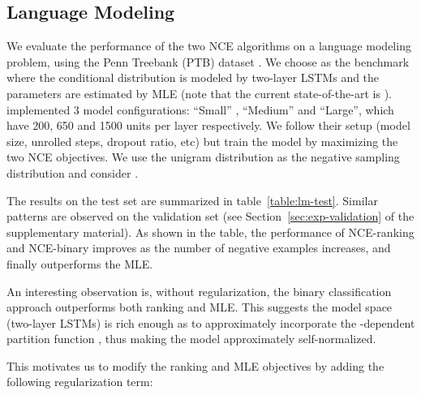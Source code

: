 \documentclass[11pt,a4paper]{article}
\newcommand{\commentout}[1]{}
\begin{document}
\subsection{Language Modeling}
\label{sec:lm}

We evaluate the performance of the two NCE algorithms on a language
modeling problem, using the Penn Treebank (PTB) dataset
\cite{marcus1993building}. 
We choose \cite{zaremba2014recurrent} as the benchmark where the
 conditional distribution is modeled by two-layer LSTMs and the parameters are estimated by MLE (note that the current state-of-the-art is \cite{yang2018breaking}). 
\citet{zaremba2014recurrent} implemented 3 model configurations:
``Small'' , ``Medium'' and ``Large'', which have 200, 650 and 1500
units per layer respectively. We follow their setup
(model size, unrolled steps, dropout ratio, etc) but train the model by maximizing the two
NCE objectives. We use the unigram distribution as the negative sampling distribution and consider . 
\commentout{
The current state-of-art results were achieved by \cite{zaremba2014recurrent}
using two-layer recurrent neural networks with LSTM units and dropout.
\cite{zaremba2014recurrent} implemented 3 model configurations:
``Small'' , ``Medium'' and ``Large'', which have 200, 650 and 1500
units per layer respectively (see \citep{zaremba2014recurrent} for
more details).  These models are trained by maximizing the likelihood
function, which is computationally intensive.  We follow the setup
(model size, unrolled steps, dropout ratio, etc) of
\cite{zaremba2014recurrent} but train the model by maximizing the two
NCE objectives. We use the unigram distribution as the negative sampling distribution and consider . }


The results on the test set are summarized in table~\ref{table:lm-test}. Similar patterns are observed on the validation set (see Section~\ref{sec:exp-validation} of the supplementary material). As shown in the table, the performance of NCE-ranking and NCE-binary improves as the number of negative examples increases, and finally outperforms the MLE. 

An interesting observation is, without regularization, the binary classification approach
outperforms both ranking and MLE. This suggests the model space (two-layer LSTMs) is rich enough as to approximately incorporate the -dependent partition function , thus making the model approximately self-normalized.
\commentout{
Based on the theory in this paper, the success of the binary approach might indicate the
conditional distribution is approximately self-normalized.
When the intrinsic dimension of  is much smaller than its ambient dimension or the model complexity of the scoring function is large (e.g. neural networks), self-normalization could hold approximately, in which case the binary approach covers the true model with a smaller model space and hence could achieve better finite-sample performance. }
This motivates us to modify the ranking
and MLE objectives by adding the following regularization term:
\end{document}
